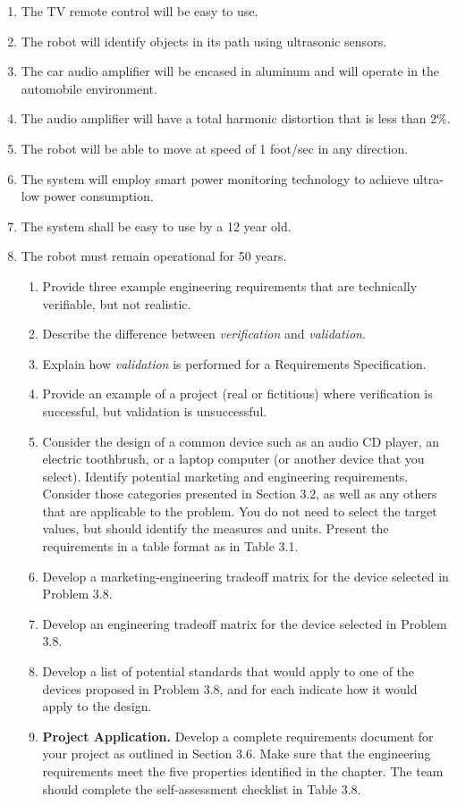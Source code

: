 \begin{enumerate}
\def\labelenumi{\alph{enumi})}
\item
  The TV remote control will be easy to use.
\item
  The robot will identify objects in its path using ultrasonic sensors.
\item
  The car audio amplifier will be encased in aluminum and will operate
  in the automobile environment.
\item
  The audio amplifier will have a total harmonic distortion that is less
  than 2\%.
\item
  The robot will be able to move at speed of 1 foot/sec in any
  direction.
\item
  The system will employ smart power monitoring technology to achieve
  ultra-low power consumption.
\item
  The system shall be easy to use by a 12 year old.
\item
  The robot must remain operational for 50 years.

  \begin{enumerate}
  \def\labelenumii{\arabic{enumii}.}
  \item
    Provide three example engineering requirements that are technically
    verifiable, but not realistic.
  \item
    Describe the difference between \emph{verification} and
    \emph{validation}.
  \item
    Explain how \emph{validation} is performed for a Requirements
    Specification.
  \item
    Provide an example of a project (real or fictitious) where
    verification is successful, but validation is unsuccessful.
  \item
    Consider the design of a common device such as an audio CD player,
    an electric toothbrush, or a laptop computer (or another device that
    you select). Identify potential marketing and engineering
    requirements. Consider those categories presented in Section 3.2, as
    well as any others that are applicable to the problem. You do not
    need to select the target values, but should identify the measures
    and units. Present the requirements in a table format as in Table
    3.1.
  \item
    Develop a marketing-engineering tradeoff matrix for the device
    selected in Problem 3.8.
  \item
    Develop an engineering tradeoff matrix for the device selected in
    Problem 3.8.
  \item
    Develop a list of potential standards that would apply to one of the
    devices proposed in Problem 3.8, and for each indicate how it would
    apply to the design.
  \item
    \textbf{Project Application.} Develop a complete requirements
    document for your project as outlined in Section 3.6. Make sure that
    the engineering requirements meet the five properties identified in
    the chapter. The team should complete the self-assessment checklist
    in Table 3.8.
  \end{enumerate}
\end{enumerate}